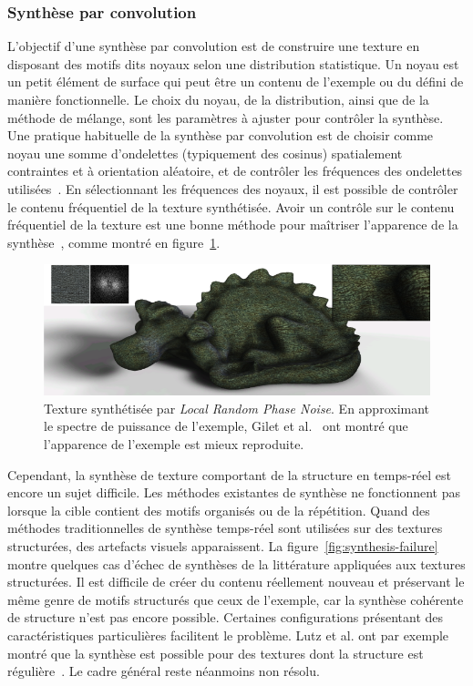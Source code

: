 \subsubsection{Synthèse par convolution}

L'objectif d'une synthèse par convolution est de construire une texture en disposant des motifs dits \og noyaux \fg selon une distribution statistique. Un noyau est un petit élément de surface qui peut être un contenu de l'exemple ou du défini de manière fonctionnelle. Le choix du noyau, de la distribution, ainsi que de la méthode de mélange, sont les paramètres à ajuster pour contrôler la synthèse. Une pratique habituelle de la synthèse par convolution est de choisir comme noyau une somme d'ondelettes (typiquement des cosinus) spatialement contraintes et à orientation aléatoire, et de contrôler les fréquences des ondelettes utilisées~\cite{tricard_procedural_2019}. En sélectionnant les fréquences des noyaux, il est possible de contrôler le contenu fréquentiel de la texture synthétisée. Avoir un contrôle sur le contenu fréquentiel de la texture est une bonne méthode pour maîtriser l'apparence de la synthèse~\cite{gilet_local_2014}, comme montré en figure~\ref{fig:lrpn}.

\bigskip

\begin{figure}
    \centering
    \includegraphics[width=.8\textwidth]{contenu/resources/images/lrpn}
    \caption[Maîtriser le contenu fréquentiel permet de contrôler l'apparence d'une synthèse]{Texture synthétisée par \textit{Local Random Phase Noise}. En approximant le spectre de puissance de l'exemple, Gilet et al.~\cite{gilet_local_2014} ont montré que l'apparence de l'exemple est mieux reproduite.}
    \label{fig:lrpn}
\end{figure}

Cependant, la synthèse de texture comportant de la structure en temps-réel est encore un sujet difficile. Les méthodes existantes de synthèse ne fonctionnent pas lorsque la cible contient des motifs organisés ou de la répétition. Quand des méthodes traditionnelles de synthèse temps-réel sont utilisées sur des textures structurées, des artefacts visuels apparaissent. La figure~\ref{fig:synthesis-failure} montre quelques cas d'échec de synthèses de la littérature appliquées aux textures structurées. Il est difficile de créer du contenu réellement nouveau et préservant le même genre de motifs structurés que ceux de l'exemple, car la synthèse cohérente de structure n'est pas encore possible. Certaines configurations présentant des caractéristiques particulières facilitent le problème. Lutz et al. ont par exemple montré que la synthèse est possible pour des textures dont la structure est régulière~\cite{lutz_cyclostationary-gaussian_2021}. Le cadre général reste néanmoins non résolu.

